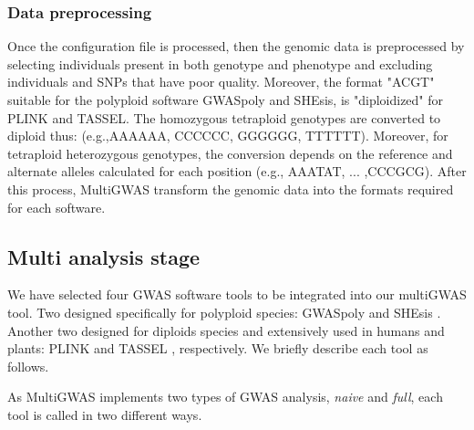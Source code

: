 \documentclass{article}
\begin{document}
\subsubsection{Data preprocessing}
Once the configuration file is processed, then the genomic data is preprocessed by selecting individuals present in both genotype and phenotype and excluding individuals and SNPs that have poor quality. Moreover, the format   "ACGT" suitable for the polyploid software GWASpoly and SHEsis, is "diploidized" for PLINK and TASSEL. The homozygous tetraploid genotypes are converted to diploid thus: (e.g.,AAAA\textrightarrow AA, CCCC\textrightarrow CC, GGGG\textrightarrow GG,
TTTT\textrightarrow TT). Moreover, for tetraploid heterozygous genotypes, the conversion depends on the reference and alternate alleles calculated for each position (e.g., AAAT\textrightarrow AT,
... ,CCCG\textrightarrow CG). After this process, MultiGWAS transform the genomic data into the formats required for each software.



\subsection{Multi analysis stage} 

We have selected four GWAS software tools to be integrated into our multiGWAS tool. Two designed specifically for polyploid species: GWASpoly \cite{Rosyara2016} and SHEsis \cite{Yong2006}. Another two designed for diploids species and extensively used in humans and plants: PLINK \cite{Purcell2007,Chang2015} and TASSEL \cite{Bradbury2007}, respectively. We briefly describe each tool as follows.


As MultiGWAS implements two types of GWAS analysis,  \emph{naive} and  \emph{full}, each tool is called in two different ways.
\end{document}
